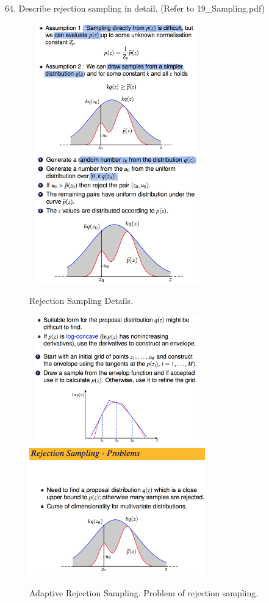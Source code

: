 \documentclass[11pt,a4paper]{article}
\begin{document}
64. Describe rejection sampling in detail. (Refer to 19\_Sampling.pdf)
\begin{figure}[H] \centering
    \includegraphics[width=3in,height=2.2in]{./figure/rejectSampling_1.png}
    \includegraphics[width=3in,height=2.2in]{./figure/rejectSampling_2.png} \\
    \caption{Rejection Sampling Details.}
\end{figure}
\begin{figure}[H] \centering
    \includegraphics[width=3in,height=2.2in]{./figure/rejectSampling_3.png}
    \includegraphics[width=3in,height=2.2in]{./figure/rejectSampling_4.png}
    \caption{Adaptive Rejection Sampling. Problem of rejection sampling.}
\end{figure}
\end{document}
